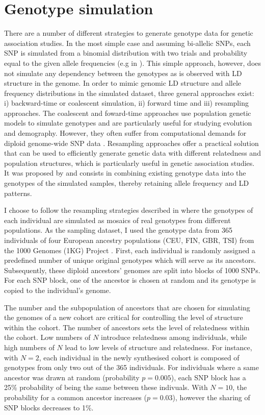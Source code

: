 \section{Genotype simulation}
\label{section:genotype-simulation}
There are a number of different strategies to generate genotype data for genetic association studies. In the most simple case and assuming bi-allelic SNPs, each SNP is simulated from a binomial distribution with two trials and probability equal to the given allele frequencies  (e.g in \citep{Lippert2013}). This simple approach, however, does not simulate any dependency between the genotypes as is observed with LD structure in the genome. In order to mimic genomic LD structure and allele frequency distributions in the simulated dataset, three general approaches exist: i) backward-time or coalescent simulation, ii) forward time and iii) resampling approaches. The coalescent \citep{Hudson2002,Ewing2010,Kelleher2016} and foward-time approaches \citep{Peng2007,Hoggart2007,Carvajal-Rodriguez2008} use population genetic models to simulate genotypes and are particularly useful for studying evolution and demography. However, they often suffer from computational demands for diploid genome-wide SNP data \citep{Liu2008,Yuan2012}. Resampling approaches offer a practical solution that can be used to efficiently generate genetic data with different relatedness and population structures, which is particularly useful in genetic association studies. It was proposed by \citet{Wright2007} and consists in combining existing genotype data into the genotypes of the simulated samples, thereby retaining allele frequency and LD patterns. 

I choose to follow the resampling strategies described in \citep{Loh2014,Casale2015} where the genotypes of each individual are simulated as mosaics of real genotypes from different populations. As the sampling dataset, I used the genotype data from \num{365} individuals of four European ancestry populations (CEU, FIN, GBR, TSI) from the 1000 Genomes (1KG) Project \citep{1000Genomes2015}.  First, each individual is randomly assigned a predefined number of unique original genotypes which will serve as its ancestors. Subsequently, these diploid ancestors' genomes are split into blocks of \num{1000} SNPs. For each SNP block, one of the ancestor is chosen at random and its genotype is copied to the individual's genome. 

The number and the subpopulation of ancestors that are chosen for simulating the genomes of a new cohort are critical for controlling the level of structure within the cohort. The number of ancestors sets the level of relatedness within the cohort. Low numbers of \(N\) introduce relatedness among individuals, while high numbers of \(N\) lead to low levels of structure and relatedness.  For instance, with \(N=2\), each individual in the newly synthesised cohort is composed of genotypes from only two out of the \num{365} individuals. For individuals where a same ancestor was drawn at random (probability \(p=0.005\)), each SNP block has a \num{25}\% probability of being the same between these indivuals. With \(N=10\), the probability for a common ancestor increases (\(p=0.03\)), however the sharing of SNP blocks decreases to \num{1}\%. 

